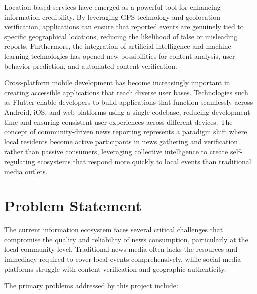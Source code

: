 Location-based services have emerged as a powerful tool for enhancing information credibility. By leveraging GPS technology and geolocation verification, applications can ensure that reported events are genuinely tied to specific geographical locations, reducing the likelihood of false or misleading reports. Furthermore, the integration of artificial intelligence and machine learning technologies has opened new possibilities for content analysis, user behavior prediction, and automated content verification.

Cross-platform mobile development has become increasingly important in creating accessible applications that reach diverse user bases. Technologies such as Flutter enable developers to build applications that function seamlessly across Android, iOS, and web platforms using a single codebase, reducing development time and ensuring consistent user experiences across different devices. The concept of community-driven news reporting represents a paradigm shift where local residents become active participants in news gathering and verification rather than passive consumers, leveraging collective intelligence to create self-regulating ecosystems that respond more quickly to local events than traditional media outlets.

\section{Problem Statement}
\label{sec:intro_prob_art}

The current information ecosystem faces several critical challenges that compromise the quality and reliability of news consumption, particularly at the local community level. Traditional news media often lacks the resources and immediacy required to cover local events comprehensively, while social media platforms struggle with content verification and geographic authenticity.

The primary problems addressed by this project include:

